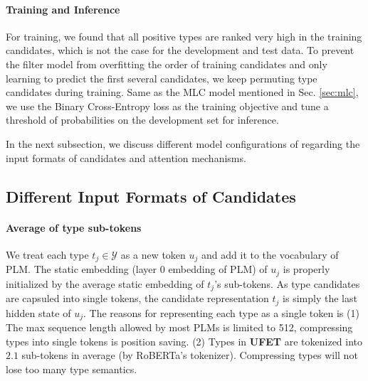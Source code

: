 \paragraph{Training and Inference} For training, we found that all positive types are ranked very high in the training candidates, which is not the case for the development and test data. To prevent the filter model from overfitting the order of training candidates and only learning to predict the first several candidates, we keep permuting type candidates during training. Same as the MLC model mentioned in Sec. \ref{sec:mlc}, we use the Binary Cross-Entropy loss as the training objective and tune a threshold of probabilities on the development set for inference.

In the next subsection, we discuss different model configurations of {\bf \textsc{\name}} regarding the input formats of candidates and attention mechanisms.

\subsection{Different Input Formats of Candidates}
\paragraph{Average of type sub-tokens} We treat each type $t_j \in \mathcal{Y}$ as a new token $u_j$ and add it to the vocabulary of PLM. The static embedding (layer 0 embedding of PLM) of $u_j$ is properly initialized by the average static embedding of $t_j$'s sub-tokens. As type candidates are capsuled into single tokens, the candidate representation $t_j$ is simply the last hidden state of $u_j$. The reasons for representing each type as a single token is (1) The max sequence length allowed by most PLMs is limited to 512, compressing types into single tokens is position saving. (2) Types in {\bf \textsc{UFET}} are tokenized into $2.1$ sub-tokens in average (by RoBERTa's tokenizer). Compressing types will not lose too many type semantics.
